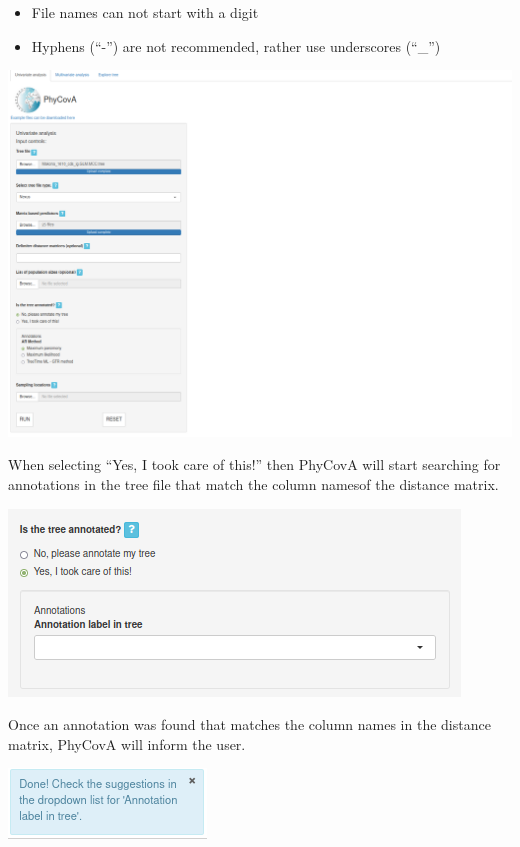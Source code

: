 \documentclass[
]{article}
\begin{document}
\begin{itemize}
\item
  File names can not start with a digit
\item
  Hyphens (``-'') are not recommended, rather use underscores (``\_'')
\end{itemize}

\includegraphics{tutorial_img/Annotated_before_run.png}

When selecting ``Yes, I took care of this!'' then PhyCovA will start
searching for annotations in the tree file that match the column namesof
the distance matrix.

\includegraphics{tutorial_img/Annotation_label_notfoundyet.png}

Once an annotation was found that matches the column names in the
distance matrix, PhyCovA will inform the user.

\includegraphics{tutorial_img/Annotation_PopUp.png}
\end{document}
